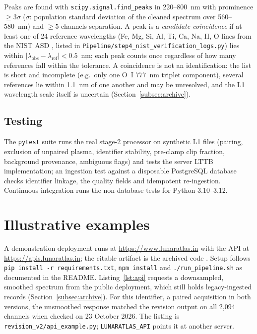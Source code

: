 \documentclass[final,5p,twocolumn,a4paper]{elsarticle}
\begin{document}
Peaks are found with \texttt{scipy.signal.find\_peaks} in 220--800~nm with prominence $\ge 3\sigma$ ($\sigma$: population standard deviation of the cleaned spectrum over 560--580~nm) and $\ge5$ channels separation. A peak is a \emph{candidate coincidence} if at least one of 24 reference wavelengths (Fe, Mg, Si, Al, Ti, Ca, Na, H, O lines from the NIST ASD \cite{nist_asd}, listed in \texttt{Pipeline/step4\_nist\_verification\_logs.py}) lies within $|\lambda_{\mathrm{obs}}-\lambda_{\mathrm{ref}}|<0.5$~nm; each peak counts once regardless of how many references fall within the tolerance. A coincidence is not an identification: the list is short and incomplete (e.g.\ only one O~I 777~nm triplet component), several references lie within 1.1~nm of one another and may be unresolved, and the L1 wavelength scale itself is uncertain (Section~\ref{subsec:archive}).

\subsection{Testing}
\label{subsec:testing}

The \texttt{pytest} suite runs the real stage-2 processor on synthetic L1 files (pairing, exclusion of unpaired plasma, identifier stability, pre-clamp clip fraction, background provenance, ambiguous flags) and tests the server LTTB implementation; an ingestion test against a disposable PostgreSQL database checks identifier linkage, the quality fields and idempotent re-ingestion. Continuous integration runs the non-database tests for Python 3.10--3.12.

\section{Illustrative examples}

A demonstration deployment runs at \url{https://www.lunaratlas.in} with the API at \url{https://apis.lunaratlas.in}; the citable artifact is the archived code \cite{lunaratlas_zenodo}. Setup follows \texttt{pip install -r requirements.txt}, \texttt{npm install} and \texttt{./run\_pipeline.sh} as documented in the README. Listing~\ref{lst:api} requests a downsampled, smoothed spectrum from the public deployment, which still holds legacy-ingested records (Section~\ref{subsec:archive}). For this identifier, a paired acquisition in both versions, the unsmoothed response matched the revision output on all 2,094 channels when checked on 23 October 2026. The listing is \texttt{revision\_v2/api\_example.py}; \texttt{LUNARATLAS\_API} points it at another server.
\end{document}
